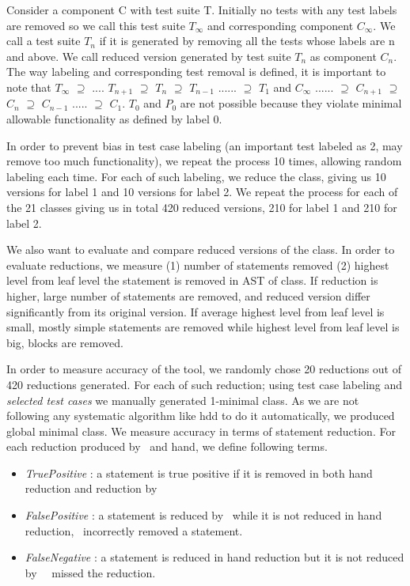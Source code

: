 Consider a component C with test suite T. Initially no tests with any test labels are removed so we call this test suite $T_\infty$ and corresponding component $C_\infty$. We call a test suite $T_n$ if it is generated by removing all the tests whose labels are n and above. We call reduced version generated by test suite $T_{n}$ as component $C_{n}$. The way labeling and corresponding test removal is defined, it is important to note that $T_{\infty}$ $\supseteq$  .... $T_{n+1}$ $\supseteq$ $T_{n}$ $\supseteq$ $T_{n-1}$ ......  $\supseteq$ $T_{1}$ and $C_{\infty}$ ...... $\supseteq$  $C_{n+1}$ $\supseteq$ $C_{n}$ $\supseteq$ $C_{n-1}$ ..... $\supseteq$ $C_{1}$. $T_{0}$ and $P_{0}$ are not possible because they violate minimal allowable functionality as defined by label 0. 
	
In order to prevent bias in test case labeling (an important test labeled as 2, may remove too much functionality), we repeat the process 10 times, allowing random labeling each time. For each of such labeling, we reduce the class, giving us 10 versions for label 1 and 10 versions for label 2. We repeat the process for each of the 21 classes giving us in total 420 reduced versions, 210 for label 1 and 210 for label 2.    

We also want to evaluate and compare reduced versions of the class. In order to evaluate reductions, we measure (1) number of statements removed (2) highest level from leaf level the statement is removed in AST of class. If reduction is higher, large number of statements are removed, and reduced version differ significantly from its original version. If average highest level from leaf level is small, mostly simple statements are removed while highest level from leaf level is big, blocks are removed. 

In order to measure accuracy of the tool, we randomly chose 20 reductions out of 420 reductions generated. For each of such reduction; using test case labeling and \emph{selected test cases} we manually generated 1-minimal class. As we are not following any systematic algorithm like hdd to do it automatically, we produced global minimal class. We measure accuracy in terms of statement reduction.  For each reduction produced by \mytool\ and hand, we define following terms. 

\begin{itemize}
\item \emph{TruePositive} : a statement is true positive if it is removed in both hand reduction and reduction by \mytool\
\item \emph{FalsePositive} : a statement is reduced by \mytool\ while it is not reduced in hand reduction, \mytool\ incorrectly removed a statement.
\item \emph{FalseNegative} : a statement is reduced in hand reduction but it is not reduced by \mytool\, \mytool\ missed the reduction.
\end{itemize}
   
 


   

 


